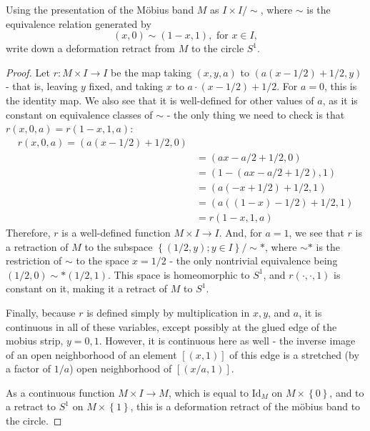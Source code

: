 \documentclass[12pt]{article}
\theoremstyle{definition}
\newenvironment{problem}[2][Problem]{\begin{trivlist}
\item[\hskip \labelsep {\bfseries #1}\hskip \labelsep {\bfseries #2.}]}{\end{trivlist}}
\begin{document}
\begin{problem}{2}
	Using the presentation of the M\"obius band $M$ as $I \times I / \sim$, where $\sim$ is the equivalence relation generated by 
	\[ (x, 0) \sim (1 - x, 1), \text{ for $x \in I$},\]
	write down a deformation retract from $M$ to the circle $S^1$.
	\begin{proof}
		Let $r : M \times I \to I$ be the map taking $(x, y, a)$ to $(a (x - 1/2) + 1/2, y)$ - that is, leaving $y$ fixed, and taking $x $ to $a \cdot (x - 1/2) + 1/2$. For $a = 0$, this is the identity map. We also see that it is well-defined for other values of $a$, as it is constant on equivalence classes of $\sim$ - the only thing we need to check is that $r(x,0, a) = r(1-x, 1, a)$:
		\begin{align*}
			r(x,0,a) = (a(x - 1/2) + 1/2, 0)\\
			&= (ax - a/2 + 1/2, 0)\\
			&= (1 - (ax - a/2 + 1/2), 1)\\
			&= (a (-x + 1/2) + 1/2, 1)\\
			&= (a ( (1 - x) - 1/2 ) + 1/2, 1)\\
			&= r(1-x,1,a)
		\end{align*}
		Therefore, $r$ is a well-defined function $M \times I \to I$. And, for $a = 1$, we see that $r$ is a retraction of $M$ to the subspace $\left\{ (1/2, y) ; y \in I \right\} / \sim*$, where $\sim*$ is the restriction of $\sim$ to the space $x = 1/2$ - the only nontrivial equivalence being $(1/2, 0) \sim* (1/2,1)$. This space is homeomorphic to $S^1$, and $r(\cdot, \cdot, 1)$ is constant on it, making it a retract of $M$ to $S^1$. 
		\par Finally, because $r$ is defined simply by multiplication in $x, y$, and $a$, it is continuous in all of these variables, except possibly at the glued edge of the mobius strip, $y = 0, 1$. However, it is continuous here as well - the inverse image of an open neighborhood of an element $[(x, 1)]$ of this edge is a stretched (by a factor of $1/a$) open neighborhood of $[(x/a, 1)]$.
		\par As a continuous function $M \times I \to M$, which is equal to $\text{Id}_M$ on $M \times \left\{ 0 \right\}$, and to a retract to $S^1$ on $M \times \left\{ 1 \right\}$, this is a deformation retract of the m\"obius band to the circle.
	\end{proof}
\end{problem}
\end{document}
